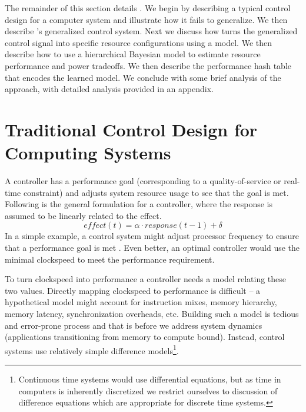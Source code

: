 The remainder of this section details \SYSTEM{}.  We begin by
describing a typical control design for a computer system and
illustrate how it fails to generalize.  We then describe \SYSTEM{}'s
generalized control system.  Next we discuss how \SYSTEM{} turns the
generalized control signal into specific resource configurations using
a model.  We then describe how to use a hierarchical Bayesian model to
estimate resource performance and power tradeoffs.  We then describe
the performance hash table that encodes the learned model. We conclude
with some brief analysis of the approach, with detailed analysis
provided in an appendix.


\section{Traditional Control Design for Computing Systems}
A controller has a performance goal (corresponding to a
quality-of-service or real-time constraint) and adjusts system resource
usage to see that the goal is met. Following is the general formulation for a controller, where the response is assumed to be linearly related to the effect.
\begin{equation}
  effect(t) = \alpha \cdot response(t-1) + \delta \label{eqn:clock}
\end{equation}
In a simple example, a control
system might adjust processor frequency to ensure that a performance
goal is met \cite{lefurgy}.  Even better, an optimal controller would
use the minimal clockspeed to meet the performance requirement.


To turn clockspeed into performance a controller needs a model
relating these two values.  Directly mapping clockspeed to performance
is difficult -- a hypothetical model might account for instruction
mixes, memory hierarchy, memory latency, synchronization overheads,
etc.  Building such a model is tedious and error-prone process and
that is before we address system dynamics (\eg applications
transitioning from memory to compute bound).  Instead, control systems
use relatively simple difference models\footnote{Continuous time
  systems would use differential equations, but as time in computers
  is inherently discretized we restrict ourselves to discussion of
  difference equations which are appropriate for discrete time
  systems.}. 

